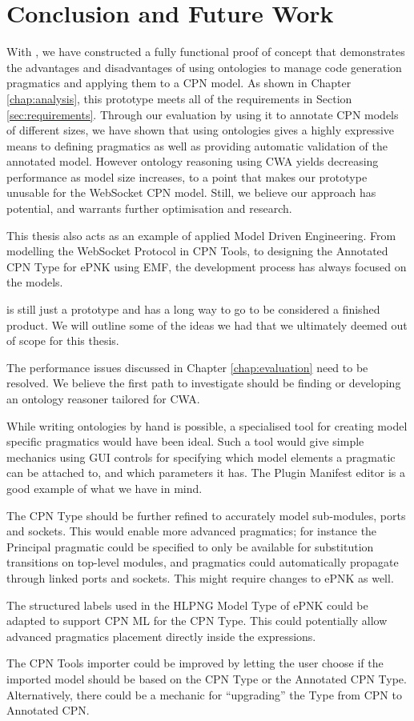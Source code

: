 \chapter{Conclusion and Future Work}
\label{chap:conclusion}

With \thename{}, we have constructed a fully functional proof of concept that
demonstrates the advantages and disadvantages of using ontologies to manage code
generation pragmatics and applying them to a CPN model. As shown in Chapter
\ref{chap:analysis}, this prototype meets all of the requirements in Section
\ref{sec:requirements}. Through our evaluation by using it to annotate CPN
models of different sizes, we have shown that using ontologies gives a highly
expressive means to defining pragmatics as well as providing automatic
validation of the annotated model. However ontology reasoning using CWA yields
decreasing performance as model size increases, to a point that makes our
prototype unusable for the WebSocket CPN model. Still, we believe our approach
has potential, and warrants further optimisation and research.

This thesis also acts as an example of applied Model Driven Engineering. From
modelling the WebSocket Protocol in CPN Tools, to designing the Annotated CPN
Type for ePNK using EMF, the development process has always focused on the
models. 

\thename{} is still just a prototype and has a long way to go to be considered a
finished product. We will outline some of the ideas we had that
we ultimately deemed out of scope for this thesis. 

The performance issues discussed in Chapter \ref{chap:evaluation} need to
be resolved. We believe the first path to investigate should be finding or
developing an ontology reasoner tailored for CWA.

While writing ontologies by hand is possible, a specialised tool for creating
model specific pragmatics would have been ideal.
Such a tool would give simple mechanics using GUI controls for specifying which
model elements a pragmatic can be attached to, and which parameters it has. The
Plugin Manifest editor is a good example of what we have in mind. 

The CPN Type should be further refined to accurately model sub-modules, ports
and sockets. This would enable more advanced pragmatics; for instance the
Principal pragmatic could be specified to only be available for substitution
transitions on top-level modules, and pragmatics could automatically propagate
through linked ports and sockets. This might require changes to ePNK as well.

The structured labels used in the HLPNG Model Type of ePNK could be adapted to
support CPN ML for  the CPN Type. This could potentially allow advanced pragmatics
placement directly inside the expressions.

The CPN Tools importer could be improved by letting the user choose if the
imported model should be based on the CPN Type or the Annotated CPN Type.
Alternatively, there could be a mechanic for ``upgrading'' the Type from CPN to
Annotated CPN.

